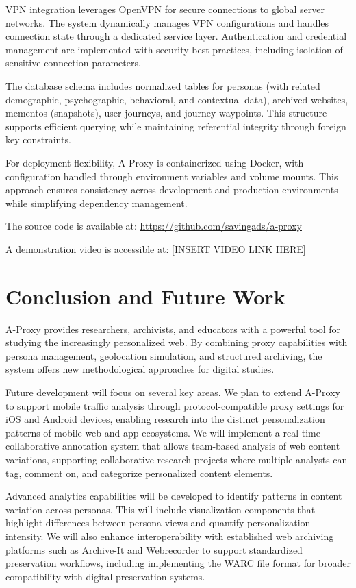\documentclass[sigconf]{acmart}
\begin{document}
VPN integration leverages OpenVPN for secure connections to global server networks. The system dynamically manages VPN configurations and handles connection state through a dedicated service layer. Authentication and credential management are implemented with security best practices, including isolation of sensitive connection parameters.

The database schema includes normalized tables for personas (with related demographic, psychographic, behavioral, and contextual data), archived websites, mementos (snapshots), user journeys, and journey waypoints. This structure supports efficient querying while maintaining referential integrity through foreign key constraints.

For deployment flexibility, A-Proxy is containerized using Docker, with configuration handled through environment variables and volume mounts. This approach ensures consistency across development and production environments while simplifying dependency management.

The source code is available at: \url{https://github.com/savingads/a-proxy}

A demonstration video is accessible at: \url{[INSERT VIDEO LINK HERE]}

\section{Conclusion and Future Work}
A-Proxy provides researchers, archivists, and educators with a powerful tool for studying the increasingly personalized web. By combining proxy capabilities with persona management, geolocation simulation, and structured archiving, the system offers new methodological approaches for digital studies.

Future development will focus on several key areas. We plan to extend A-Proxy to support mobile traffic analysis through protocol-compatible proxy settings for iOS and Android devices, enabling research into the distinct personalization patterns of mobile web and app ecosystems. We will implement a real-time collaborative annotation system that allows team-based analysis of web content variations, supporting collaborative research projects where multiple analysts can tag, comment on, and categorize personalized content elements.

Advanced analytics capabilities will be developed to identify patterns in content variation across personas. This will include visualization components that highlight differences between persona views and quantify personalization intensity. We will also enhance interoperability with established web archiving platforms such as Archive-It and Webrecorder to support standardized preservation workflows, including implementing the WARC file format for broader compatibility with digital preservation systems.
\end{document}
